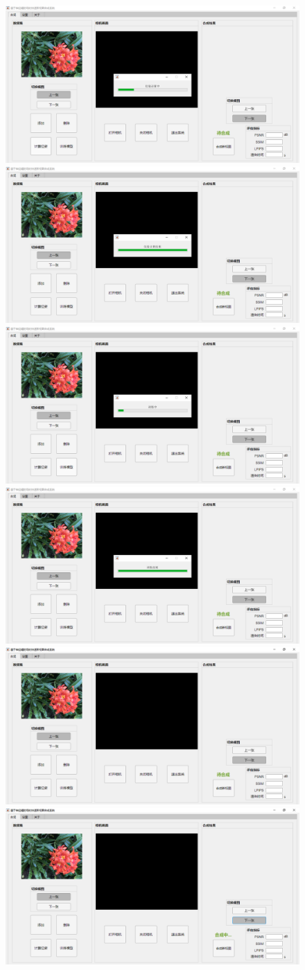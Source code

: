 \begin{figure}[bhtp]
  \centering
  \subcaptionbox{\label{fig:viewsynthesis-a}}
    {\includegraphics[width=0.45\linewidth]{figures/system/3-a.png}}
  \subcaptionbox{\label{fig:viewsynthesis-b}}
    {\includegraphics[width=0.45\linewidth]{figures/system/3-b.png}}
  \subcaptionbox{\label{fig:viewsynthesis-c}}
    {\includegraphics[width=0.45\linewidth]{figures/system/3-c.png}}
  \subcaptionbox{\label{fig:viewsynthesis-d}}
    {\includegraphics[width=0.45\linewidth]{figures/system/3-d.png}}
  \subcaptionbox{\label{fig:viewsynthesis-e}}
    {\includegraphics[width=0.45\linewidth]{figures/system/3-e.png}}
  \subcaptionbox{\label{fig:viewsynthesis-f}}
    {\includegraphics[width=0.45\linewidth]{figures/system/3-f.png}}

\end{figure}

